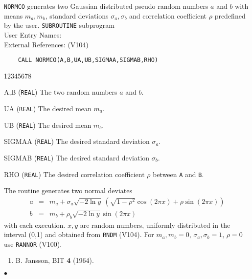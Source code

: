                            
                         
\Submitter{}                                
                          
{\tt NORMCO} generates two Gaussian distributed pseudo random numbers
$a$ and $b$ with means $m_a,m_b$, standard deviations $\sigma_a,\sigma_b$
and correlation coefficient $\rho$ predefined by the user.
\Structure
{\tt SUBROUTINE} subprogram \\
User Entry Names: \\
External References:  (V104)
\Usage
\begin{verbatim}
    CALL NORMCO(A,B,UA,UB,SIGMAA,SIGMAB,RHO)
\end{verbatim}
\begin{DLtt}{12345678}
\item [A,B] ({\tt REAL}) The two random numbers $a$ and $b$.
\item [UA] ({\tt REAL}) The desired mean $m_a$.
\item [UB] ({\tt REAL}) The desired mean $m_b$.
\item [SIGMAA] ({\tt REAL}) The desired standard deviation $\sigma_a$.
\item [SIGMAB] ({\tt REAL}) The desired standard deviation $\sigma_b$.
\item [RHO] ({\tt REAL}) The desired correlation coefficient $\rho$
between {\tt A} and {\tt B}.
\end{DLtt}
\Method
The routine generates two normal deviates
\begin{eqnarray*}
a & = & m_a+\sigma_a \sqrt{-2\ln y}\:
\left( \sqrt{1-\rho^2} \cos(2\pi x)+\rho \sin(2\pi x) \right) \\
b & = & m_b+\rho_b \sqrt{-2\ln y} \sin(2\pi x)
\end{eqnarray*}
with each execution. $x,y$ are random numbers, uniformly
distributed in the interval (0,1) and obtained from {\tt RNDM} (V104).
\Notes
For $m_a,m_b=0$, $\sigma_a,\sigma_b=1$, $\rho=0$ use {\tt RANNOR} (V100).
\Refer
\begin{enumerate}
\item B. Jansson, BIT  {\bf 4} (1964).
\end{enumerate}
$\bullet$
